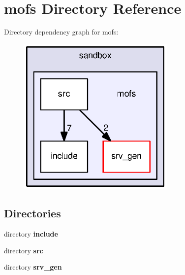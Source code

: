 \section{mofs Directory Reference}
\label{dir_aaff46ca8133c4b696f85dea6ab62811}
Directory dependency graph for mofs\-:
\nopagebreak
\begin{figure}[H]
\begin{center}
\leavevmode
\includegraphics[width=218pt]{dir_aaff46ca8133c4b696f85dea6ab62811_dep}
\end{center}
\end{figure}
\subsection*{Directories}
\begin{DoxyCompactItemize}
\item 
directory {\bf include}
\item 
directory {\bf src}
\item 
directory {\bf srv\-\_\-gen}
\end{DoxyCompactItemize}
